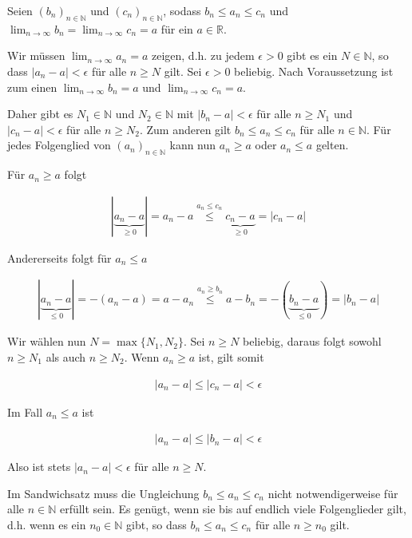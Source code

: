 \documentclass[fontsize=9pt,
               parskip=half-,
               DIV=14,
               listof=chapterentry,
               tocflat]{scrbook}
\begin{document}
\begin{proof*}[Sandwichsatz]
Seien $(b_{n})_{n\in \mathbb {N} }$ und $(c_{n})_{n\in \mathbb {N} }$, sodass $b_{n}\leq a_{n}\leq c_{n}$ und $\lim _{n\rightarrow \infty }b_{n}=\lim _{n\rightarrow \infty }c_{n}=a$ für ein $a\in \mathbb {R} $.

Wir müssen $\lim _{n\to \infty }a_{n}=a$ zeigen, d.h. zu jedem $\epsilon >0$ gibt es ein $N\in \mathbb {N} $, so dass $|a_{n}-a|<\epsilon $ für alle $n\geq N$ gilt. Sei $\epsilon >0$ beliebig. Nach Voraussetzung ist zum einen $\lim _{n\to \infty }b_{n}=a$ und $\lim _{n\to \infty }c_{n}=a$.

Daher gibt es $N_{1}\in \mathbb {N} $ und $N_{2}\in \mathbb {N} $ mit $|b_{n}-a|<\epsilon $ für alle $n\geq N_{1}$ und $|c_{n}-a|<\epsilon $ für alle $n\geq N_{2}$. Zum anderen gilt $b_{n}\leq a_{n}\leq c_{n}$ für alle $n\in \mathbb {N} $. Für jedes Folgenglied von $(a_{n})_{n\in \mathbb {N} }$ kann nun $a_{n}\geq a$ oder $a_{n}\leq a$ gelten.

Für $a_{n}\geq a$ folgt

\begin{align*}
|\underbrace {a_{n}-a} _{\geq 0}|=a_{n}-a{\overset {a_{n}\leq c_{n}}{\leq }}\underbrace {c_{n}-a} _{\geq 0}=|c_{n}-a|
\end{align*}

Andererseits folgt für $a_{n}\leq a$

\begin{align*}
|\underbrace {a_{n}-a} _{\leq 0}|=-(a_{n}-a)=a-a_{n}{\overset {a_{n}\geq b_{n}}{\leq }}a-b_{n}=-(\underbrace {b_{n}-a} _{\leq 0})=|b_{n}-a|
\end{align*}

Wir wählen nun $N=\max\{N_{1},N_{2}\}$. Sei $n\geq N$ beliebig, daraus folgt sowohl $n\geq N_{1}$ als auch $n\geq N_{2}$. Wenn $a_{n}\geq a$ ist, gilt somit

\begin{align*}
|a_{n}-a|\leq |c_{n}-a|<\epsilon 
\end{align*}

Im Fall $a_{n}\leq a$ ist

\begin{align*}
|a_{n}-a|\leq |b_{n}-a|<\epsilon 
\end{align*}

Also ist stets $|a_{n}-a|<\epsilon $ für alle $n\geq N$.

\end{proof*}

\begin{hint*}
Im Sandwichsatz muss die Ungleichung $b_{n}\leq a_{n}\leq c_{n}$ nicht notwendigerweise für alle $n\in \mathbb {N} $ erfüllt sein. Es genügt, wenn sie bis auf endlich viele Folgenglieder gilt, d.h. wenn es ein $n_{0}\in \mathbb {N} $ gibt, so dass $b_{n}\leq a_{n}\leq c_{n}$ für alle $n\geq n_{0}$ gilt.

\end{hint*}
\end{document}
